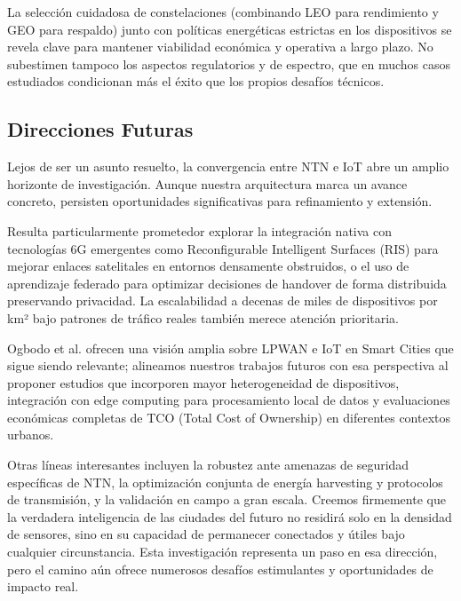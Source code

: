 La selección cuidadosa de constelaciones (combinando LEO para rendimiento y GEO para respaldo) junto con políticas energéticas estrictas en los dispositivos se revela clave para mantener viabilidad económica y operativa a largo plazo. No subestimen tampoco los aspectos regulatorios y de espectro, que en muchos casos estudiados condicionan más el éxito que los propios desafíos técnicos.

\subsection{Direcciones Futuras}

Lejos de ser un asunto resuelto, la convergencia entre NTN e IoT abre un amplio horizonte de investigación. Aunque nuestra arquitectura marca un avance concreto, persisten oportunidades significativas para refinamiento y extensión.

Resulta particularmente prometedor explorar la integración nativa con tecnologías 6G emergentes como Reconfigurable Intelligent Surfaces (RIS) para mejorar enlaces satelitales en entornos densamente obstruidos, o el uso de aprendizaje federado para optimizar decisiones de handover de forma distribuida preservando privacidad. La escalabilidad a decenas de miles de dispositivos por km² bajo patrones de tráfico reales también merece atención prioritaria.

Ogbodo et al. \cite{Ogbodo2022} ofrecen una visión amplia sobre LPWAN e IoT en Smart Cities que sigue siendo relevante; alineamos nuestros trabajos futuros con esa perspectiva al proponer estudios que incorporen mayor heterogeneidad de dispositivos, integración con edge computing para procesamiento local de datos y evaluaciones económicas completas de TCO (Total Cost of Ownership) en diferentes contextos urbanos.

Otras líneas interesantes incluyen la robustez ante amenazas de seguridad específicas de NTN, la optimización conjunta de energía harvesting y protocolos de transmisión, y la validación en campo a gran escala. Creemos firmemente que la verdadera inteligencia de las ciudades del futuro no residirá solo en la densidad de sensores, sino en su capacidad de permanecer conectados y útiles bajo cualquier circunstancia. Esta investigación representa un paso en esa dirección, pero el camino aún ofrece numerosos desafíos estimulantes y oportunidades de impacto real.